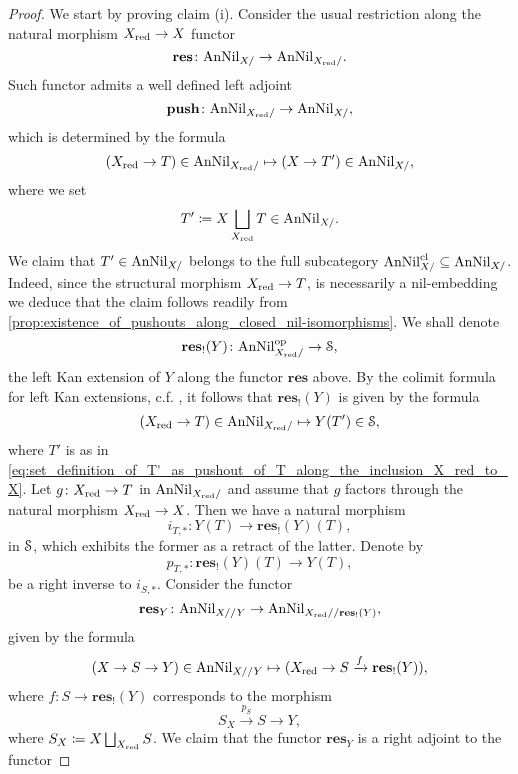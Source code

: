 \documentclass[10pt,a4paper,reqno]{amsart} %
\theoremstyle{plain}
\theoremstyle{definition}
\theoremstyle{remark}
\numberwithin{equation}{section}
\begin{document}
\begin{proof}
    We start by proving claim (i). Consider the usual restriction along the natural morphism $X_{\mathrm{red}} \to X$ functor 
        \[\mathbf{res} \colon \mathrm{AnNil}_{X/} \to \mathrm{AnNil}_{X_{\mathrm{red}}/}.\]
    Such functor admits a well defined left adjoint
        \[\mathbf{push} \colon \mathrm{AnNil}_{X_{\mathrm{red}}/} \to \mathrm{AnNil}_{X/},\]
    which is determined by the formula
        \[
            (X_{\mathrm{red}} \to T) \in \mathrm{AnNil}_{X_{\mathrm{red}} /} \mapsto (X \to T') \in \mathrm{AnNil}_{X/},   
        \]
    where we set
        \begin{equation} \label{eq:set_definition_of_T'_as_pushout_of_T_along_the_inclusion_X_red_to_X}
            T' \coloneqq X \bigsqcup_{X_{\mathrm{red}}} T \in \mathrm{AnNil}_{X/}.  
        \end{equation}
    We claim that $T' \in \mathrm{AnNil}_{X/}$ belongs to the full subcategory $\mathrm{AnNil}^{\mathrm{cl}}_{X/} \subseteq \mathrm{AnNil}_{X/}$.
    Indeed, since the structural morphism
        $X_{\mathrm{red}} \to T$,
    is necessarily a nil-embedding we deduce that the claim follows readily from \cref{prop:existence_of_pushouts_along_closed_nil-isomorphisms}.
    We shall denote
        \[
            \mathbf{res}_!(Y) \colon \mathrm{AnNil}^\mathrm{op}_{X_{\mathrm{red}} /} \to \mathcal S,
        \]
    the left Kan extension of $Y$ along the functor $\mathbf{res}$ above. By the colimit formula
    for left Kan extensions, c.f. \cite[Lemma 4.3.2.13]{HTT}, it follows that $\mathbf{res}_!(Y)$ is given by the formula
        \[
            (X_{\mathrm{red}} \to T) \in  \mathrm{AnNil}_{X_{\mathrm{red}} /} \mapsto Y(T') \in \mathcal S,
        \]
    where $T'$ is as in \eqref{eq:set_definition_of_T'_as_pushout_of_T_along_the_inclusion_X_red_to_X}.
    Let $g \colon X_{\mathrm{red}} \to T$ in $\mathrm{AnNil}_{X_{\mathrm{red}}/}$ and assume that $g$ factors through the natural morphism $X_{\mathrm{red}} \to X$. Then we have a natural morphism
        \[
           i_{T, *} \colon Y(T) \to \mathbf{res}_!(Y)(T) ,  
        \]
    in $\mathcal S$, which exhibits the former as a retract of the latter. Denote by
        \[
            p_{T, *} \colon \mathbf{res}_!(Y)(T) \to Y(T),  
        \]
    be a right inverse to $i_{S, *}$. Consider the functor
        \[
            \mathbf{res}_Y \colon \mathrm{AnNil}_{X//Y} \to \mathrm{AnNil}_{X_{\mathrm{red}} / /\mathbf{res}_!(Y)},  
        \]
    given by the formula
        \[
            (X \to S \to Y) \in \mathrm{AnNil}_{X//Y} \mapsto (X_{\mathrm{red}} \to S \xrightarrow{f} \mathbf{res}_!(Y)),  
        \]
    where $f \colon S \to \mathbf{res}_!(Y)$ corresponds to the morphism
        \[  
            S_X \xrightarrow{p_S} S \to Y,
        \]
    where $S_X \coloneqq X \bigsqcup_{X_{\mathrm{red}}} S$. We claim that the functor $\mathbf{res}_Y$ is a right adjoint to the functor

\end{proof}
\end{document}
